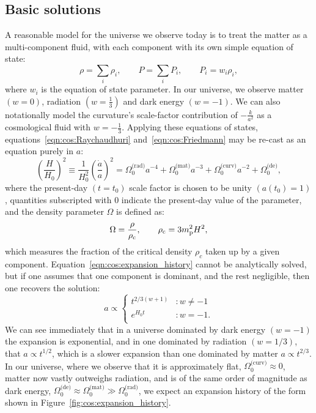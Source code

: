 \subsection{Basic solutions}
A reasonable model for the universe we observe today is to treat the matter as a multi-component fluid, with each component with its own simple equation of state:
\begin{equation}
  \rho = \sum_i \rho_i, \qquad P = \sum_i P_i, \qquad P_i = w_i \rho_i,
  \label{eqn:cos:multi_component}
\end{equation}
where $w_i$ is the equation of state parameter. In our universe, we observe matter $(w=0)$, radiation $(w=\frac{1}{3})$ and dark energy $(w=-1)$. We can also notationally model the curvature's scale-factor contribution of $-\frac{k}{a^2}$ as a cosmological fluid with $w=-\frac{1}{3}$. Applying these equations of states, equations~\eqref{eqn:cos:Raychaudhuri} and~\eqref{eqn:cos:Friedmann} may be re-cast as an equation purely in $a$:
\begin{equation}
  {\left( \frac{H}{H_0} \right)}^2 \equiv 
  \frac{1}{H_0^2}{\left( \frac{\dot{a}}{a} \right)}^2 =
  \Omega^\text{(rad)}_0 a^{-4} +
  \Omega^\text{(mat)}_0 a^{-3} + 
  \Omega^\text{(curv)}_0 a^{-2} +
  \Omega^\text{(de)}_0,
  \label{eqn:cos:expansion_history}
\end{equation}
where the present-day $(t=t_0)$ scale factor is chosen to be unity $(a(t_0)=1)$, quantities subscripted with $0$ indicate the present-day  value of the parameter, and the density parameter $\Omega$ is defined as:
\begin{equation}
  \Omega = \frac{\rho}{\rho_\mathrm{c}}, \qquad \rho_\mathrm{c} = {3m_{\mathrm{p}}^2H^2},
  \label{eqn:cos:omega_def}
\end{equation}
which measures the fraction of the critical density $\rho_c$ taken up by a given component. Equation~\eqref{eqn:cos:expansion_history} cannot be analytically solved, but if one assumes that one component is dominant, and the rest negligible, then one recovers the solution:
\begin{equation}
  a  \propto
  \left\{
  \begin{array}{ll}
    t^{2/3(w+1)} &: w\ne-1\\
    e^{H_0 t} &: w=-1.\\
  \end{array}
  \right.
\end{equation}
We can see immediately that in a universe dominated by dark energy $(w=-1)$ the expansion is exponential, and in one dominated by radiation $(w=1/3)$, that $a\propto t^{1/2}$, which is a slower expansion than one dominated by matter $a\propto t^{2/3}$. In our universe, where we observe that it is approximately flat, $\Omega_0^{\text{(curv)}}\approx0$, matter now vastly outweighs radiation, and is of the same order of magnitude as dark energy, ${\Omega_0^{\text{(de)}} \approx \Omega_0^{\text{(mat)}} \gg \Omega_0^{\text{(rad)}}}$, we expect an expansion history of the form shown in Figure~\ref{fig:cos:expansion_history}.

